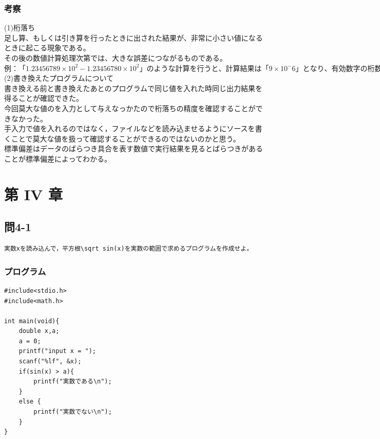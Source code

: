 \documentclass{jarticle}
\begin{document}
\subsubsection{考察\\}
(1)桁落ち\\
足し算、もしくは引き算を行ったときに出された結果が、非常に小さい値になるときに起こる現象である。\\
その後の数値計算処理次第では、大きな誤差につながるものである。\\
$例：「1.23456789×10^2-1.23456780×10^2」のような計算を行うと、計算結果は「9×10^-6」となり、有効数字の桁数は9桁から一気に1桁に減少してしまう。$\\
(2)書き換えたプログラムについて\\
書き換える前と書き換えたあとのプログラムで同じ値を入れた時同じ出力結果を得ることが確認できた。\\
今回莫大な値のを入力として与えなっかたので桁落ちの精度を確認することができなかった。\\
手入力で値を入れるのではなく，ファイルなどを読み込ませるようにソースを書くことで莫大な値を扱って確認することができるのではないのかと思う。\\
標準偏差はデータのばらつき具合を表す数値で実行結果を見るとばらつきがあることが標準偏差によってわかる。\\


\section{第 IV 章\\}
\subsection{問4-1\\}
\begin{verbatim}
実数xを読み込んで，平方根\sqrt sin(x)を実数の範囲で求めるプログラムを作成せよ。
\end{verbatim}
\subsubsection{プログラム\\}
\begin{breakbox}
\begin{verbatim}
#include<stdio.h>
#include<math.h>

int main(void){
    double x,a;
    a = 0;
    printf("input x = ");
    scanf("%lf", &x);
    if(sin(x) > a){
        printf("実数である\n");
    }
    else {
        printf("実数でない\n");
    }
}
\end{verbatim}
\end{breakbox}
\end{document}
